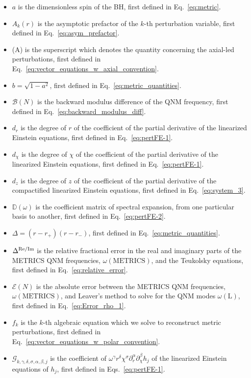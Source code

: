 \documentclass[aps,prx,amsmath,floats,floatfix,twocolumn,
  superscriptaddress,nofootinbib,showpacs]{revtex4-1}
\begin{document}
\begin{itemize}
    \item $a$ is the dimensionless spin of the BH, first defined in Eq.~\eqref{eq:metric}. 
    \item $ A_k (r) $ is the asymptotic prefactor of the $k$-th perturbation variable, first defined in Eq.~\eqref{eq:asym_prefactor}. 
    \item (A) is the superscript which denotes the quantity concerning the axial-led perturbations, first defined in Eq.~\eqref{eq:vector_equations_w_axial_convention}. 
    \item $b = \sqrt{1-a^2}$, first defined in Eq.~\eqref{eq:metric_quantities}. 
    \item $\mathcal{B}(N)$ is the backward modulus difference of the QNM frequency, first defined in Eq.~\eqref{eq:backward_modulus_diff}. 
    \item $d_{r}$ is the degree of $r$ of the coefficient of the partial derivative of the linearized Einstein equations, first defined in Eq.~\eqref{eq:pertFE-1}. 
    \item $d_{\chi}$ is the degree of $\chi$ of the coefficient of the partial derivative of the linearized Einstein equations, first defined in Eq.~\eqref{eq:pertFE-1}. 
    \item $d_{z}$ is the degree of $z$ of the coefficient of the partial derivative of the compactified linearized Einstein equations, first defined in Eq.~\eqref{eq:system_3}. 
    \item $\mathbb{D}(\omega) $ is the coefficient matrix of spectral expansion, from one particular basis to another, first defined in Eq.~\eqref{eq:pertFE-2}. 
    \item $\Delta = (r-r_+)(r-r_-)$, first defined in Eq.~\eqref{eq:metric_quantities}. 
    \item $\Delta^{\rm Re/Im}$ is the relative fractional error in the real and imaginary parts of the METRICS QNM frequencies, $\omega(\text{METRICS})$, and the Teukolsky equations, first defined in Eq.~\eqref{eq:relative_error}. 
    \item $\mathcal{E}(N)$ is the absolute error between the METRICS QNM frequencies, $\omega(\text{METRICS})$, and Leaver's method to solve for the QNM modes $\omega (\text{L})$, first defined in Eq.~\eqref{eq:Error_rho_1}. 
    \item $f_k$ is the $k$-th algebraic equation which we solve to reconstruct metric perturbations, first defined in Eq.~\eqref{eq:vector_equations_w_polar_convention}. 
    \item $\mathcal{G}_{k, \gamma, \delta, \sigma, \alpha, \beta, j} $ is the coefficient of $\omega^\gamma r^{\delta} \chi^{\sigma} \partial_{r}^{\alpha} \partial_{\chi}^{\beta} h_j$ of the linearized Einstein equations of $h_j$, first defined in Eqs.~\eqref{eq:pertFE-1}. 

\end{itemize}
\end{document}
